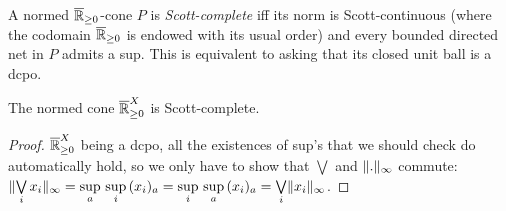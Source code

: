 \begin{definition}
 A normed $\overline{\mathbb{R}}_{\geq 0}$-cone $P$ is \emph{Scott-complete} iff its norm is Scott-continuous (where the codomain $\overline{\mathbb{R}}_{\geq 0}$ is endowed with its usual order) and every bounded directed net in $P$ admits a sup.
 This is equivalent to asking that its closed unit ball is a dcpo.
\end{definition}

\begin{proposition}
 The normed cone $\overline{\mathbb{R}}_{\geq 0}^X$ is Scott-complete.
\end{proposition}
\begin{proof}
 $\overline{\mathbb{R}}_{\geq 0}^X$ being a dcpo, all the existences of sup's that we should check do automatically hold, so we only have to show that $\bigvee$ and $\lVert.\rVert_\infty$ commute:
 $\lVert\bigvee\limits_i x_i\rVert_\infty=
 \sup\limits_a\, \sup\limits_i\, (x_i)_a =
 \sup\limits_i\, \sup\limits_a\, (x_i)_a =
 \bigvee\limits_i \lVert x_i\rVert_\infty$.
\end{proof}



